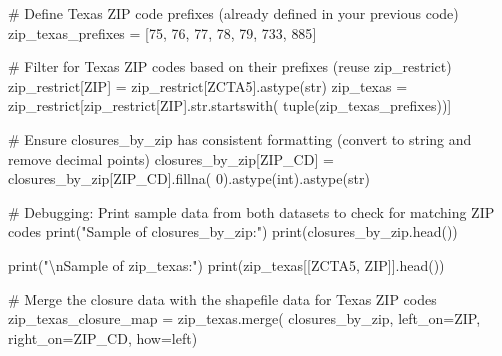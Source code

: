 \documentclass[
  letterpaper,
  DIV=11,
  numbers=noendperiod]{scrartcl}
\newenvironment{Shaded}{\begin{snugshade}}{\end{snugshade}}
\newcommand{\BuiltInTok}[1]{\textcolor[rgb]{0.00,0.23,0.31}{#1}}
\newcommand{\CharTok}[1]{\textcolor[rgb]{0.13,0.47,0.30}{#1}}
\newcommand{\CommentTok}[1]{\textcolor[rgb]{0.37,0.37,0.37}{#1}}
\newcommand{\DecValTok}[1]{\textcolor[rgb]{0.68,0.00,0.00}{#1}}
\newcommand{\NormalTok}[1]{\textcolor[rgb]{0.00,0.23,0.31}{#1}}
\newcommand{\OperatorTok}[1]{\textcolor[rgb]{0.37,0.37,0.37}{#1}}
\newcommand{\StringTok}[1]{\textcolor[rgb]{0.13,0.47,0.30}{#1}}
\begin{document}
\begin{Shaded}
\begin{Highlighting}[]
\CommentTok{\# Define Texas ZIP code prefixes (already defined in your previous code)}
\NormalTok{zip\_texas\_prefixes }\OperatorTok{=}\NormalTok{ [}\StringTok{\textquotesingle{}75\textquotesingle{}}\NormalTok{, }\StringTok{\textquotesingle{}76\textquotesingle{}}\NormalTok{, }\StringTok{\textquotesingle{}77\textquotesingle{}}\NormalTok{, }\StringTok{\textquotesingle{}78\textquotesingle{}}\NormalTok{, }\StringTok{\textquotesingle{}79\textquotesingle{}}\NormalTok{, }\StringTok{\textquotesingle{}733\textquotesingle{}}\NormalTok{, }\StringTok{\textquotesingle{}885\textquotesingle{}}\NormalTok{]}

\CommentTok{\# Filter for Texas ZIP codes based on their prefixes (reuse zip\_restrict)}
\NormalTok{zip\_restrict[}\StringTok{\textquotesingle{}ZIP\textquotesingle{}}\NormalTok{] }\OperatorTok{=}\NormalTok{ zip\_restrict[}\StringTok{\textquotesingle{}ZCTA5\textquotesingle{}}\NormalTok{].astype(}\BuiltInTok{str}\NormalTok{)}
\NormalTok{zip\_texas }\OperatorTok{=}\NormalTok{ zip\_restrict[zip\_restrict[}\StringTok{\textquotesingle{}ZIP\textquotesingle{}}\NormalTok{].}\BuiltInTok{str}\NormalTok{.startswith(}
    \BuiltInTok{tuple}\NormalTok{(zip\_texas\_prefixes))]}

\CommentTok{\# Ensure closures\_by\_zip has consistent formatting (convert to string and remove decimal points)}
\NormalTok{closures\_by\_zip[}\StringTok{\textquotesingle{}ZIP\_CD\textquotesingle{}}\NormalTok{] }\OperatorTok{=}\NormalTok{ closures\_by\_zip[}\StringTok{\textquotesingle{}ZIP\_CD\textquotesingle{}}\NormalTok{].fillna(}
    \DecValTok{0}\NormalTok{).astype(}\BuiltInTok{int}\NormalTok{).astype(}\BuiltInTok{str}\NormalTok{)}

\CommentTok{\# Debugging: Print sample data from both datasets to check for matching ZIP codes}
\BuiltInTok{print}\NormalTok{(}\StringTok{"Sample of closures\_by\_zip:"}\NormalTok{)}
\BuiltInTok{print}\NormalTok{(closures\_by\_zip.head())}

\BuiltInTok{print}\NormalTok{(}\StringTok{"}\CharTok{\textbackslash{}n}\StringTok{Sample of zip\_texas:"}\NormalTok{)}
\BuiltInTok{print}\NormalTok{(zip\_texas[[}\StringTok{\textquotesingle{}ZCTA5\textquotesingle{}}\NormalTok{, }\StringTok{\textquotesingle{}ZIP\textquotesingle{}}\NormalTok{]].head())}

\CommentTok{\# Merge the closure data with the shapefile data for Texas ZIP codes}
\NormalTok{zip\_texas\_closure\_map }\OperatorTok{=}\NormalTok{ zip\_texas.merge(}
\NormalTok{    closures\_by\_zip, left\_on}\OperatorTok{=}\StringTok{\textquotesingle{}ZIP\textquotesingle{}}\NormalTok{, right\_on}\OperatorTok{=}\StringTok{\textquotesingle{}ZIP\_CD\textquotesingle{}}\NormalTok{, how}\OperatorTok{=}\StringTok{\textquotesingle{}left\textquotesingle{}}\NormalTok{)}


\end{Highlighting}
\end{Shaded}
\end{document}
